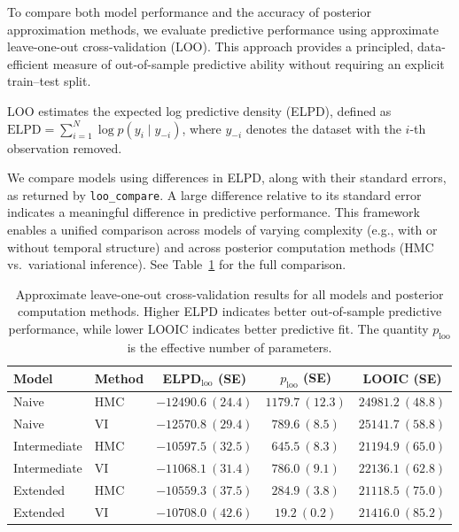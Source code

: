 \documentclass[12pt,letterpaper,fleqn]{article}
\begin{document}
To compare both model performance and the accuracy of posterior approximation methods, we evaluate predictive performance using approximate leave-one-out cross-validation (LOO).
This approach provides a principled, data-efficient measure of out-of-sample predictive ability without requiring an explicit train–test split.

LOO estimates the expected log predictive density (ELPD), defined as
$\mathrm{ELPD} = \sum_{i=1}^N \log p(y_i \mid y_{-i})$,
 where \(y_{-i}\) denotes the dataset with the \(i\)-th observation removed. 
 


We compare models using differences in ELPD, along with their standard errors, as returned by \texttt{loo\_compare}. A large difference relative to its standard error indicates a meaningful difference in predictive performance. This framework enables a unified comparison across models of varying complexity (e.g., with or without temporal structure) and across posterior computation methods (HMC vs.\ variational inference). See Table~\ref{tab:loo-all-models} for the full comparison. 

\begin{table}[htbp]
\centering
\caption{Approximate leave-one-out cross-validation results for all models and posterior computation methods. Higher ELPD indicates better out-of-sample predictive performance, while lower LOOIC indicates better predictive fit. The quantity \(p_{\mathrm{loo}}\) is the effective number of parameters.}
\label{tab:loo-all-models}
\begin{tabular}{llccc}
\hline
Model & Method & ELPD$_{\mathrm{loo}}$ (SE) & $p_{\mathrm{loo}}$ (SE) & LOOIC (SE) \\
\hline
Naive        & HMC & $-12490.6\ (24.4)$ & $1179.7\ (12.3)$ & $24981.2\ (48.8)$ \\
Naive        & VI  & $-12570.8\ (29.4)$ & $789.6\ (8.5)$   & $25141.7\ (58.8)$ \\
Intermediate & HMC & $-10597.5\ (32.5)$ & $645.5\ (8.3)$   & $21194.9\ (65.0)$ \\
Intermediate & VI  & $-11068.1\ (31.4)$ & $786.0\ (9.1)$   & $22136.1\ (62.8)$ \\
Extended     & HMC & $-10559.3\ (37.5)$ & $284.9\ (3.8)$   & $21118.5\ (75.0)$ \\
Extended     & VI  & $-10708.0\ (42.6)$ & $19.2\ (0.2)$    & $21416.0\ (85.2)$ \\
\hline
\end{tabular}
\end{table}
\end{document}
